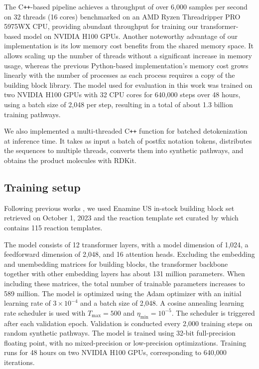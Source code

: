 The C\texttt{++}-based pipeline achieves a throughput of over 6,000 samples per second on 32 threads (16 cores) benchmarked on an AMD Ryzen Threadripper PRO 5975WX CPU, providing abundant throughput for training our transformer-based model on NVIDIA H100 GPUs.
Another noteworthy advantage of our implementation is its low memory cost benefits from the shared memory space. It allows scaling up the number of threads without a significant increase in memory usage, whereas the previous Python-based implementation's memory cost grows linearly with the number of processes as each process requires a copy of the building block library.
The model used for evaluation in this work was trained on two NVIDIA H100 GPUs with 32 CPU cores for 640,000 steps over 48 hours, using a batch size of 2,048 per step, resulting in a total of about 1.3 billion training pathways.


We also implemented a multi-threaded C\texttt{++} function for batched detokenization at inference time.
It takes as input a batch of postfix notation tokens, distributes the sequences to multiple threads, converts them into synthetic pathways, and obtains the product molecules with RDKit.


\subsection{Training setup}
\label{sec:method:training}

Following previous works \citep{luo2024projecting,gao2025generative,lee2025rethinking}, we used Enamine US in-stock building block set retrieved on October 1, 2023 and the reaction template set curated by \cite{gao2025generative} which contains 115 reaction templates. 

The model consists of 12 transformer layers, with a model dimension of 1,024, a feedforward dimension of 2,048, and 16 attention heads. Excluding the embedding and unembedding matrices for building blocks, the transformer backbone together with other embedding layers has about 131 million parameters.
When including these matrices, the total number of trainable parameters increases to 589 million.
The model is optimized using the Adam optimizer with an initial learning rate of $3\times 10^{-4}$ and a batch size of 2,048. A cosine annealing learning rate scheduler is used with $T_\text{max}=500$ and $\eta_\text{min}=10^{-5}$. The scheduler is triggered after each validation epoch.
Validation is conducted every 2,000 training steps on random synthetic pathways.
The model is trained using 32-bit full-precision floating point, with no mixed-precision or low-precision optimizations. Training runs for 48 hours on two NVIDIA H100 GPUs, corresponding to 640,000 iterations.

